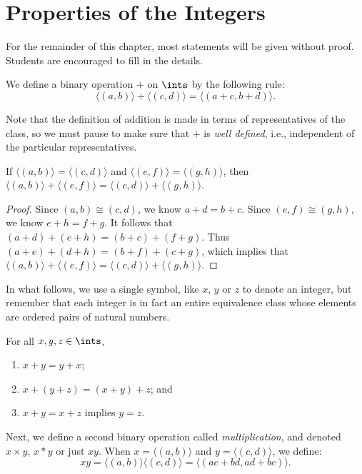 \section{Properties of the Integers}\label{s:moreintegers}

For the remainder of this chapter, most statements will be given
without proof.  Students are encouraged to fill in the
details.  

We define a binary operation $+$ on $\ints$ by the following rule:
\[
\langle(a,b)\rangle+\langle(c,d)\rangle = \langle(a+c,b+d)\rangle.  
\]

Note that the definition of addition is made in terms of 
representatives of the class, so we must pause to make sure
that $+$ is \textit{well defined}, i.e., independent of
the particular representatives.

\begin{lemma}
If $\langle(a,b)\rangle =\langle(c,d)\rangle$ and 
$\langle(e,f)\rangle=\langle(g,h)\rangle$, then
$\langle(a,b)\rangle+\langle(e,f)\rangle=
\langle(c,d)\rangle+\langle(g,h)\rangle$.
\end{lemma}

\begin{proof}
Since $(a,b)\cong(c,d)$, we know
$a+d=b+c$.  Since $(e,f)\cong(g,h)$, 
we know $e+h=f+g$. It follows that $(a+d)+(e+h) = (b+c)+ (f+g)$.
Thus $(a+e)+(d+h)= (b+f)+(c+g)$, which implies that
$\langle(a,b)\rangle+\langle(e,f)\rangle=
\langle(c,d)\rangle+\langle(g,h)\rangle$.
\end{proof}

In what follows, we use a single symbol, like $x$, $y$ or
$z$ to denote an integer, but remember that each integer
is in fact an entire equivalence class whose elements are 
ordered pairs of natural numbers.

\begin{theorem}
For all $x,y,z\in\ints$,
\begin{enumerate}
\item $x+y=y+x$;
\item $x+(y+z)= (x+y)+z$; and
\item $x+y= x+z$ implies $y=z$.
\end{enumerate}
\end{theorem}

Next, we define a second binary operation called
\textit{multiplication}, and denoted $x\times y$, $x*y$ or
just $xy$.  When $x=\langle(a,b)\rangle$ and $y=\langle(c,d)\rangle$, 
we define:
\[
xy =\langle(a,b)\rangle\langle(c,d)\rangle= \langle(ac+bd, ad+bc)\rangle.
\]

